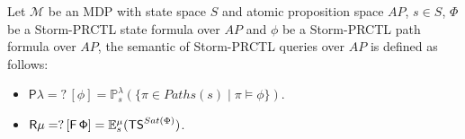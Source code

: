 \begin{definition}
 Let $\mathcal{M}$ be an MDP with state space $S$ and atomic proposition space $AP$, $s \in S$, $\Phi$ be a Storm-PRCTL state formula over $AP$ and $\phi$ be a Storm-PRCTL path formula over $AP$, the semantic of Storm-PRCTL queries over $AP$ is defined as follows:
 \begin{itemize}
   \item $\mathsf{P\lambda=? \, [\phi]} = \mathbb{P}^\lambda_s(\{ \pi \in Paths(s) \; | \; \pi \models \phi \})$.
   \item $\mathsf{R\mu=? \, [F\,\Phi]} = \mathbb{E}^\mu_s(\text{\sffamily TS}^{Sat(\Phi)})$.
 \end{itemize}
\end{definition}
